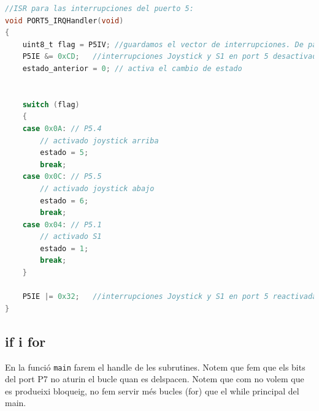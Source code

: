 \documentclass[12pt,a4paper]{article}
\begin{document}
\begin{lstlisting}[language=C]
//ISR para las interrupciones del puerto 5:
void PORT5_IRQHandler(void)
{
    uint8_t flag = P5IV; //guardamos el vector de interrupciones. De paso, al acceder a este vector, se limpia automaticamente.
    P5IE &= 0xCD;   //interrupciones Joystick y S1 en port 5 desactivadas
    estado_anterior = 0; // activa el cambio de estado


    switch (flag)
    {
    case 0x0A: // P5.4
        // activado joystick arriba
        estado = 5;
        break;
    case 0x0C: // P5.5
        // activado joystick abajo
        estado = 6;
        break;
    case 0x04: // P5.1
        // activado S1
        estado = 1;
        break;
    }

    P5IE |= 0x32;   //interrupciones Joystick y S1 en port 5 reactivadas
}
\end{lstlisting}

\subsection{if i for}

En la funció \texttt{main} farem el handle de les subrutines. Notem que fem que els bits del port P7 no aturin el bucle quan es delspacen. Notem que com no volem que es produeixi bloqueig, no fem servir més bucles (for) que el while principal del main.
\end{document}
